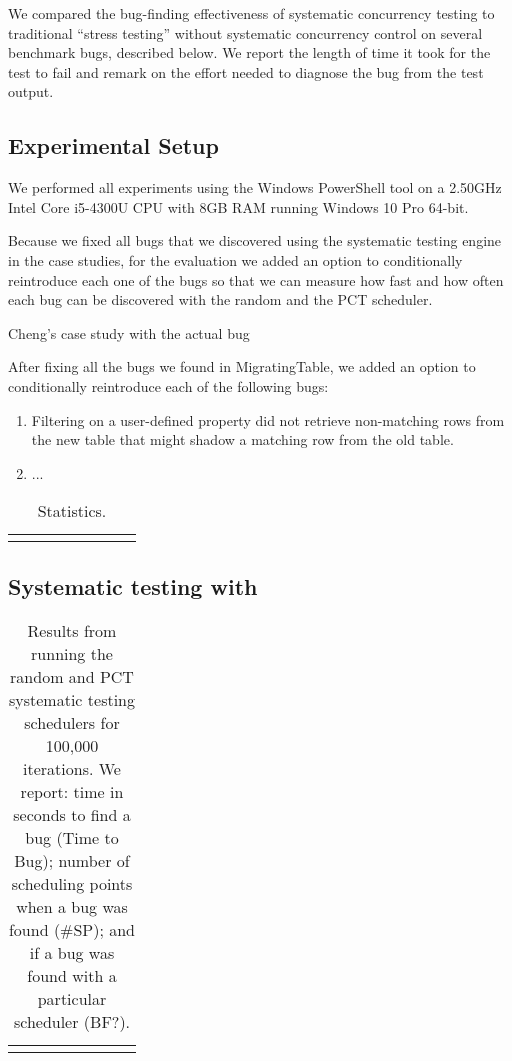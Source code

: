 We compared the bug-finding effectiveness of \psharp systematic concurrency testing to traditional ``stress testing'' without systematic concurrency control on several benchmark bugs, described below.  We report the length of time it took for the test to fail and remark on the effort needed to diagnose the bug from the test output. 

\subsection{Experimental Setup}

We performed all experiments using the Windows PowerShell tool on a 2.50GHz Intel Core i5-4300U CPU with 8GB RAM running Windows 10 Pro 64-bit.

Because we fixed all bugs that we discovered using the \psharp systematic testing engine in the case studies, for the evaluation we added an option to conditionally reintroduce each one of the bugs so that we can measure how fast and how often each bug can be discovered with the \psharp random and the PCT scheduler.

Cheng's case study with the actual bug

After fixing all the bugs we found in MigratingTable, we added an option to conditionally reintroduce each of the following bugs:
\begin{enumerate}
\item Filtering on a user-defined property did not retrieve non-matching rows from the new table that might shadow a matching row from the old table.
\item ...
\end{enumerate}

\newcommand{\colspacing}{\hspace{1.8em}}
\begin{table}[t]
\small
\centering
\setlength{\tabcolsep}{0.3em}
\label{tab:stats}
\begin{tabular}{l rrrrr rr}
\centering

\end{tabular}
\caption{Statistics.}
\end{table}

\subsection{Systematic testing with \psharp}

\setlength{\tabcolsep}{.72em}
\begin{table*}[t]
\small
\centering
\begin{tabular}{rl rrr rrr}
\centering

\end{tabular}
\caption{Results from running the \psharp random and PCT systematic testing schedulers for 100,000 iterations. We report: time in seconds to find a bug (Time to Bug); number of scheduling points when a bug was found (\#SP); and if a bug was found with a particular scheduler (BF?).}
\label{tab:testing}
\end{table*}

